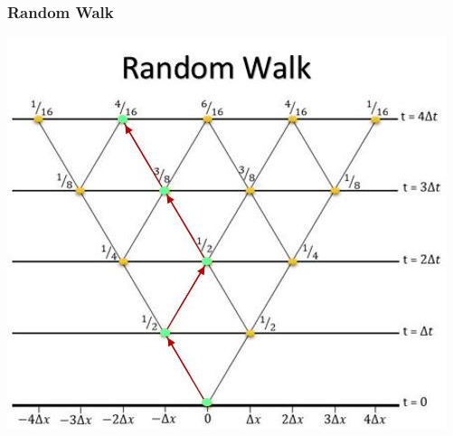 \begin{frame}
  \frametitle{Random Walk}
  \centering
  \includegraphics[scale=0.67]{RWPath}
\end{frame}
